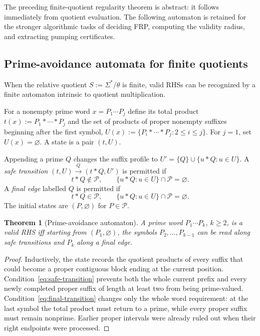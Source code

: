 \documentclass[11pt,a4paper]{article}
\newtheorem{theorem}{Theorem}[section]
\newcommand{\Pcal}{\mathcal P}
\begin{document}
The preceding finite-quotient regularity theorem is abstract: it follows immediately from quotient evaluation.  The following automaton is retained for the stronger algorithmic tasks of deciding FRP, computing the validity radius, and extracting pumping certificates.

\subsection{Prime-avoidance automata for finite quotients}
\label{sec:avoid}

When the relative quotient
\(S:=\Sigma^*/\theta\)
is finite, valid RHSs can be recognized by a finite automaton intrinsic to quotient multiplication.

For a nonempty prime word
\(x=P_1\cdots P_j\)
define its total product
\(t(x):=P_1*\cdots*P_j\)
and the set of products of proper nonempty suffixes beginning after the first symbol,
\(U(x):=\{P_i*\cdots*P_j:2\le i\le j\}.\)
For $j=1$, set $U(x)=\varnothing$.  A state is a pair $(t,U)$.

Appending a prime $Q$ changes the suffix profile to
\(U'=\{Q\}\cup\{u*Q:u\in U\}.\)
A \emph{safe transition}
\((t,U)\xrightarrow{Q}(t*Q,U')\)
is permitted if
\begin{equation}
  t*Q\notin\Pcal,
  \qquad
  \{u*Q:u\in U\}\cap\Pcal=\varnothing.
  \label{eq:safe-transition}
\end{equation}
A \emph{final edge} labelled $Q$ is permitted if
\begin{equation}
  t*Q\in\Pcal,
  \qquad
  \{u*Q:u\in U\}\cap\Pcal=\varnothing.
  \label{eq:final-transition}
\end{equation}
The initial states are $(P,\varnothing)$ for $P\in\Pcal$.

\begin{theorem}[Prime-avoidance automaton]
\label{thm:prime-avoidance}
A prime word $P_1\cdots P_k$, $k\ge2$, is a valid RHS iff starting from $(P_1,\varnothing)$, the symbols $P_2,\ldots,P_{k-1}$ can be read along safe transitions and $P_k$ along a final edge.
\end{theorem}

\begin{proof}
Inductively, the state records the quotient products of every suffix that could become a proper contiguous block ending at the current position.  Condition~\eqref{eq:safe-transition} prevents both the whole current prefix and every newly completed proper suffix of length at least two from being prime-valued.  Condition~\eqref{eq:final-transition} changes only the whole word requirement: at the last symbol the total product must return to a prime, while every proper suffix must remain nonprime.  Earlier proper intervals were already ruled out when their right endpoints were processed.
\end{proof}
\end{document}
